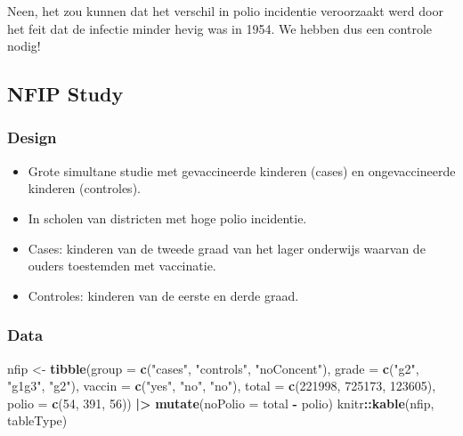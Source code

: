 \documentclass[
  12pt,dutch]{book}
\newenvironment{Shaded}{\begin{snugshade}}{\end{snugshade}}
\newcommand{\AttributeTok}[1]{\textcolor[rgb]{0.13,0.29,0.53}{#1}}
\newcommand{\DecValTok}[1]{\textcolor[rgb]{0.00,0.00,0.81}{#1}}
\newcommand{\FunctionTok}[1]{\textcolor[rgb]{0.13,0.29,0.53}{\textbf{#1}}}
\newcommand{\NormalTok}[1]{#1}
\newcommand{\OtherTok}[1]{\textcolor[rgb]{0.56,0.35,0.01}{#1}}
\newcommand{\SpecialCharTok}[1]{\textcolor[rgb]{0.81,0.36,0.00}{\textbf{#1}}}
\newcommand{\StringTok}[1]{\textcolor[rgb]{0.31,0.60,0.02}{#1}}
\providecommand{\tightlist}{%
  \setlength{\itemsep}{0pt}\setlength{\parskip}{0pt}}
\theoremstyle{definition}
\theoremstyle{definition}
\theoremstyle{definition}
\theoremstyle{definition}
\theoremstyle{remark}
\begin{document}
Neen, het zou kunnen dat het verschil in polio incidentie veroorzaakt werd door het feit dat de infectie minder hevig was in 1954.
We hebben dus een controle nodig!

\subsection{NFIP Study}\label{nfip-study}

\subsubsection{Design}\label{design}

\begin{itemize}
\tightlist
\item
  Grote simultane studie met gevaccineerde kinderen (cases) en ongevaccineerde kinderen (controles).
\item
  In scholen van districten met hoge polio incidentie.
\item
  Cases: kinderen van de tweede graad van het lager onderwijs waarvan de ouders toestemden met vaccinatie.
\item
  Controles: kinderen van de eerste en derde graad.
\end{itemize}

\subsubsection{Data}\label{data}

\begin{Shaded}
\begin{Highlighting}[]
\NormalTok{nfip }\OtherTok{\textless{}{-}} \FunctionTok{tibble}\NormalTok{(}\AttributeTok{group =} \FunctionTok{c}\NormalTok{(}\StringTok{"cases"}\NormalTok{, }\StringTok{"controls"}\NormalTok{, }\StringTok{"noConcent"}\NormalTok{),}
    \AttributeTok{grade =} \FunctionTok{c}\NormalTok{(}\StringTok{"g2"}\NormalTok{, }\StringTok{"g1g3"}\NormalTok{, }\StringTok{"g2"}\NormalTok{), }\AttributeTok{vaccin =} \FunctionTok{c}\NormalTok{(}\StringTok{"yes"}\NormalTok{,}
        \StringTok{"no"}\NormalTok{, }\StringTok{"no"}\NormalTok{), }\AttributeTok{total =} \FunctionTok{c}\NormalTok{(}\DecValTok{221998}\NormalTok{, }\DecValTok{725173}\NormalTok{, }\DecValTok{123605}\NormalTok{),}
    \AttributeTok{polio =} \FunctionTok{c}\NormalTok{(}\DecValTok{54}\NormalTok{, }\DecValTok{391}\NormalTok{, }\DecValTok{56}\NormalTok{)) }\SpecialCharTok{|\textgreater{}}
    \FunctionTok{mutate}\NormalTok{(}\AttributeTok{noPolio =}\NormalTok{ total }\SpecialCharTok{{-}}\NormalTok{ polio)}
\NormalTok{knitr}\SpecialCharTok{::}\FunctionTok{kable}\NormalTok{(nfip, tableType)}
\end{Highlighting}
\end{Shaded}
\end{document}
